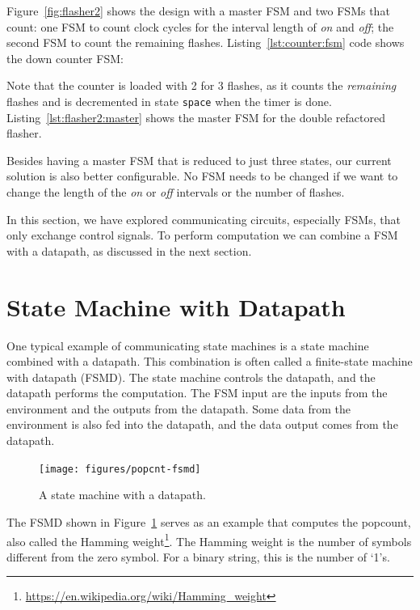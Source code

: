 \documentclass[%
    10pt,
    headinclude, footexclude,
    openright, %
    notitlepage,
    cleardoubleempty,
    headsepline,
    pointlessnumbers,
    bibtotoc, idxtotoc,
    ]{scrbook}
\newcommand{\code}[1]{{\lstinline[basicstyle=\small\ttfamily]{#1}}}
\newcommand{\myref}[2]{\href{#1}{#2}}
\renewcommand{\myref}[2]{{#2}{\footnote{\url{#1}}}}
\begin{document}
Figure~\ref{fig:flasher2} shows the design with a master FSM and two FSMs
that count: one FSM to count clock cycles for the interval length of \emph{on}
and \emph{off}; the second FSM to count the remaining flashes.
Listing~\ref{lst:counter:fsm} code shows the down counter FSM:



\noindent Note that the counter is loaded with 2 for 3 flashes, as it counts the
\emph{remaining} flashes and is decremented in state \code{space} when the timer
is done. Listing~\ref{lst:flasher2:master} shows the master FSM for the double refactored flasher.


Besides having a master FSM that is reduced to just three states, our current solution
is also better configurable. No FSM needs to be changed if we want to change
the length of the \emph{on} or \emph{off} intervals or the number of flashes.

In this section, we have explored communicating circuits, especially FSMs, that
only exchange control signals. To perform computation we can combine a FSM with
a datapath, as discussed in the next section.

\section{State Machine with Datapath}
\label{sec:fsmd}

One typical example of communicating state machines is a state machine
combined with a datapath. This combination is often called a finite-state machine
with datapath (FSMD). The state machine controls the datapath, and the datapath
performs the computation. The FSM input are the inputs from the environment and the outputs
from the datapath. Some data from the environment is also fed into the datapath, and the
data output comes from the datapath.

\begin{figure}
  \centering
  \texttt{[image: figures/popcnt-fsmd]}
  \caption{A state machine with a datapath.}
  \label{fig:popcnt-fsmd}
\end{figure}

The FSMD shown in Figure~\ref{fig:popcnt-fsmd} serves as an example that computes the
popcount, also called the \myref{https://en.wikipedia.org/wiki/Hamming_weight}{Hamming weight}.
The Hamming weight is the number of symbols different from the zero symbol.
For a binary string, this is the number of `1's.
\end{document}
